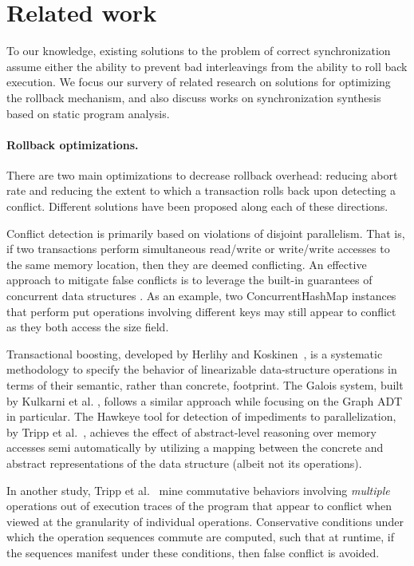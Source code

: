 \section{Related work}

To our knowledge, existing solutions to the problem of correct synchronization assume either the ability to prevent bad interleavings from the ability to roll back execution. We focus our survery of related research on solutions for optimizing the rollback mechanism, and also discuss works on synchronization synthesis based on static program analysis.

\paragraph{Rollback optimizations.} There are two main optimizations to decrease rollback overhead: reducing abort rate and reducing the extent to which a transaction rolls back upon detecting a conflict. Different solutions have been proposed along each of these directions.

Conflict detection is primarily based on violations of disjoint parallelism. That is, if two transactions perform simultaneous read/write or write/write accesses to the same memory location, then they are deemed conflicting. 
%
An effective approach to mitigate false conflicts is to leverage the built-in guarantees of concurrent data structures \cite{XXX,Galois,TYFS:OOPSLA11}. As an example, two {\sf ConcurrentHashMap} instances that perform {\sf put} operations involving different keys may still appear to conflict as they both access the {\sf size} field.

Transactional boosting, developed by Herlihy and Koskinen~\cite{XXX}, is a systematic methodology to specify the behavior of linearizable data-structure operations in terms of their semantic, rather than concrete, footprint. The Galois system, built by Kulkarni et al. \cite{Galois}, follows a similar approach while focusing on the {\sf Graph} ADT in particular. The Hawkeye tool for detection of impediments to parallelization, by Tripp et al.~\cite{TYFS:OOPSLA11}, achieves the effect of abstract-level reasoning over memory accesses semi automatically by utilizing a mapping between the concrete and abstract representations of the data structure (albeit not its operations).  

In another study, Tripp et al.~\cite{TMFS:PLDI12} mine commutative behaviors involving \emph{multiple} operations out of execution traces of the program that appear to conflict when viewed at the granularity of individual operations. Conservative conditions under which the operation sequences commute are computed, such that at runtime, if the sequences manifest under these conditions, then false conflict is avoided.


